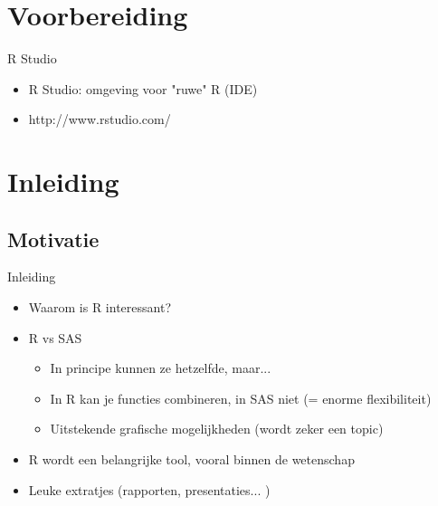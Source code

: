 \documentclass{beamer}
\begin{document}

\section{Voorbereiding}

\begin{frame}{R Studio}

\begin{itemize}
    \item R Studio: omgeving voor "ruwe" R (IDE)
    \item http://www.rstudio.com/
\end{itemize}

\end{frame}



\section{Inleiding}
\subsection{Motivatie}
\begin{frame}{Inleiding}

\begin{itemize}
    \item<1-> Waarom is R interessant? 
    \item<2-> R vs SAS
        \begin{itemize}
        \item<3-> In principe kunnen ze hetzelfde, maar... 
        \item<4-> In R kan je functies combineren, in SAS niet (= enorme flexibiliteit)
        
        
        \item<5-> Uitstekende grafische mogelijkheden (wordt zeker een topic)
        
        
        \end{itemize}
    \item<6-> R wordt een belangrijke tool, vooral binnen de wetenschap
    \item<7-> Leuke extratjes (rapporten, presentaties... )
\end{itemize}

\end{frame}
\end{document}
